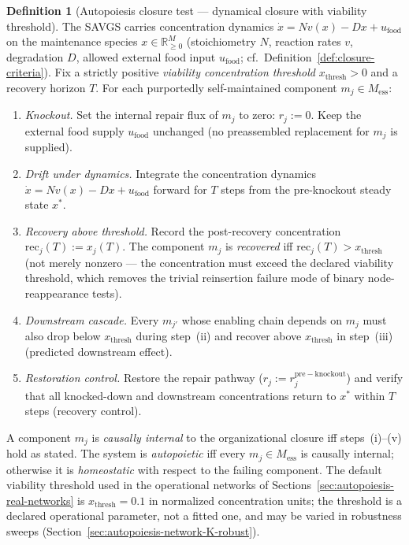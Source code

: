 \documentclass[11pt,a4paper]{article}
\theoremstyle{plain}
\theoremstyle{definition}
\newtheorem{definition}[theorem]{Definition}
\theoremstyle{remark}
\newcommand{\RR}{\mathbb{R}}
\begin{document}
\begin{definition}[Autopoiesis closure test --- dynamical closure with
viability threshold]
\label{def:autopoiesis}
The SAVGS carries concentration dynamics $\dot x = N v(x) - D x +
u_{\mathrm{food}}$ on the maintenance species $x \in \RR^{M}_{\geq 0}$
(stoichiometry $N$, reaction rates $v$, degradation $D$, allowed
external food input $u_{\mathrm{food}}$; cf.\
Definition~\ref{def:closure-criteria}). Fix a strictly positive
\emph{viability concentration threshold} $x_{\mathrm{thresh}} > 0$ and
a recovery horizon $T$. For each purportedly self-maintained
component $m_j \in M_{\mathrm{ess}}$:
\begin{enumerate}[label=\textit{(\roman*)},leftmargin=*,itemsep=2pt]
\item \emph{Knockout.} Set the internal repair flux of
$m_j$ to zero: $r_j := 0$. Keep the external food supply
$u_{\mathrm{food}}$ unchanged (no preassembled replacement for $m_j$
is supplied).
\item \emph{Drift under dynamics.} Integrate the
concentration dynamics $\dot x = N v(x) - D x + u_{\mathrm{food}}$
forward for $T$ steps from the pre-knockout steady state $x^*$.
\item \emph{Recovery above threshold.} Record the
post-recovery concentration $\mathrm{rec}_{j}(T) := x_{j}(T)$. The
component $m_j$ is \emph{recovered} iff
$\mathrm{rec}_{j}(T) > x_{\mathrm{thresh}}$ (not merely nonzero ---
the concentration must exceed the declared viability threshold, which
removes the trivial reinsertion failure mode of binary node-reappearance
tests).
\item \emph{Downstream cascade.} Every $m_{j'}$ whose
enabling chain depends on $m_j$ must also drop below
$x_{\mathrm{thresh}}$ during step~(ii) and recover above
$x_{\mathrm{thresh}}$ in step~(iii) (predicted downstream effect).
\item \emph{Restoration control.} Restore the repair
pathway ($r_j := r_j^{\mathrm{pre-knockout}}$) and verify that all
knocked-down and downstream concentrations return to $x^*$ within $T$
steps (recovery control).
\end{enumerate}
A component $m_j$ is \emph{causally internal} to the organizational
closure iff steps~(i)--(v) hold as stated. The system is
\emph{autopoietic} iff every $m_j \in M_{\mathrm{ess}}$ is causally
internal; otherwise it is \emph{homeostatic} with respect to the
failing component. The default viability threshold used in the
operational networks of Sections~\ref{sec:autopoiesis-real-networks}
is $x_{\mathrm{thresh}} = 0.1$ in normalized concentration units; the
threshold is a declared operational parameter, not a fitted one, and
may be varied in robustness sweeps
(Section~\ref{sec:autopoiesis-network-K-robust}).
\end{definition}
\end{document}
